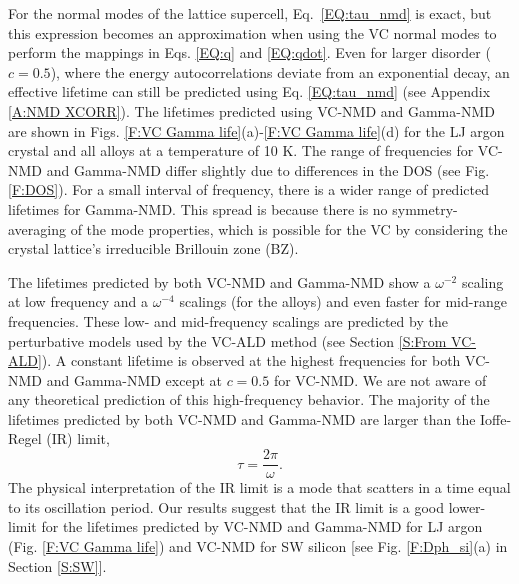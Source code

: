\documentclass[aps,prb,onecolumn,preprint,footinbib,superscriptaddress,amsmath,amssymb,floatfix]{revtex4}
\begin{document}
For the normal modes of the lattice supercell, 
Eq.~\eqref{EQ:tau_nmd} is exact, but this expression becomes an 
approximation when 
using the VC normal modes to perform the mappings in Eqs.  
\eqref{EQ:q} and \eqref{EQ:qdot}. 
Even for larger disorder ($c=0.5$),  
where the energy autocorrelations 
deviate from an exponential decay, 
an effective lifetime can still be predicted 
using Eq. \eqref{EQ:tau_nmd} (see Appendix \ref{A:NMD XCORR}). 
The lifetimes predicted using VC-NMD and Gamma-NMD  
are shown in Figs. \ref{F:VC Gamma life}(a)-\ref{F:VC Gamma life}(d) 
for the LJ argon crystal and all alloys at a temperature of 10 K. 
The range of frequencies for 
VC-NMD and Gamma-NMD differ slightly due to differences in 
the DOS (see Fig. \ref{F:DOS}). 
For a small interval of frequency, there is a wider range of 
predicted lifetimes for Gamma-NMD. This spread is because there 
is no symmetry-averaging of the mode properties, 
which is possible for the VC by considering the crystal 
lattice's irreducible Brillouin zone (BZ).\cite{ashcroft_solid_1976} 

The lifetimes predicted by both VC-NMD and Gamma-NMD 
show a $\omega^{-2}$ scaling at low frequency and a $\omega^{-4}$ 
scalings (for the alloys) and 
even faster for mid-range frequencies. These low- and mid-frequency 
scalings are predicted by the perturbative models used by 
the VC-ALD method (see Section \ref{S:From VC-ALD}). 
A constant lifetime is observed at the highest frequencies  
for both VC-NMD and Gamma-NMD  
except at $c=0.5$ for VC-NMD.  
We are not aware of any theoretical 
prediction of this high-frequency behavior.
The majority of the lifetimes predicted by both VC-NMD and Gamma-NMD  
are larger than the Ioffe-Regel (IR) limit,
\cite{taraskin_determination_1999} 
\begin{equation}\label{EQ:IR}
\tau = \frac{2\pi}{\omega}.
\end{equation}
The physical interpretation of the IR limit is a mode that  
scatters in a time equal to its oscillation period. Our results suggest 
that the IR limit is a good lower-limit for the lifetimes predicted 
by VC-NMD and Gamma-NMD 
for LJ argon (Fig. \ref{F:VC Gamma life}) 
and VC-NMD for SW silicon [see Fig. \ref{F:Dph_si}(a) in 
Section \ref{S:SW}]. 
\end{document}
